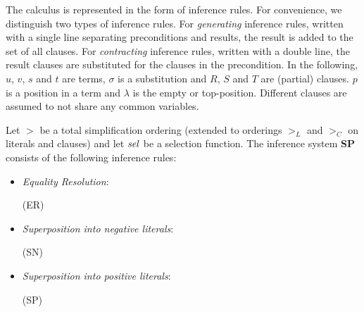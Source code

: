 \documentclass{article}
\begin{document}
The calculus is represented in the form of inference rules. For
convenience, we distinguish two types of inference rules. For
\emph{generating} inference rules, written with a single line
separating preconditions and results, the result is added to the set
of all clauses. For \emph{contracting} inference rules, written with a
double line, the result clauses are substituted for the clauses in the
precondition. In the following, $u$, $v$, $s$ and $t$ are terms,
$\sigma$ is a substitution and $R$, $S$ and $T$ are (partial) clauses.
$p$ is a position in a term and $\lambda$ is the empty or
top-position. Different clauses are assumed to not share any common
variables.


\begin{definition}
 \label{def:basics:inferences:sp}
 Let $>$ be a total simplification ordering (extended to orderings
 $>_L$ and $>_C$ on literals and clauses) and let $\mathit{sel}$ be a
 selection function.  The inference system \textbf{SP} consists of the
 following inference rules:

  \begin{itemize}
  \item \emph{Equality Resolution}:
    
    \bigskip (ER) 
    
  \item \emph{Superposition into negative literals}:
    
    \bigskip (SN) 
    
  \item \emph{Superposition into positive literals}:
    
    \bigskip (SP) 


\end{itemize}
\end{definition}
\end{document}
